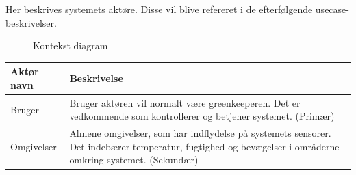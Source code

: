 Her beskrives systemets aktøre. Disse vil blive refereret i de efterfølgende usecase-beskrivelser.

\begin{figure}[htbp] \centering
{}
\caption{Kontekst diagram}
\label{lab:kontekstdiagram}
\end{figure}

%

\begin{table}[!htbp] \centering
	\begin{tabular}{|p{2.5cm}|p{11.5cm}|}
	\hline
		\textbf{Aktør navn} & \textbf{Beskrivelse} \\\hline
		Bruger & Bruger aktøren vil normalt være greenkeeperen. Det er vedkommende som kontrollerer og betjener systemet. (Primær) \\\hline

		Omgivelser & Almene omgivelser, som har indflydelse på systemets sensorer. Det indebærer temperatur, fugtighed og bevægelser i områderne omkring systemet. (Sekundær) \\\hline
	\end{tabular}
\end{table}

